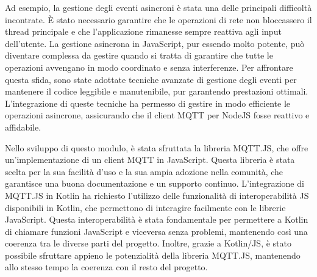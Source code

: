 \documentclass[12pt,a4paper,openright,twoside]{book}
\begin{document}
Ad esempio, la gestione degli eventi asincroni è stata una delle principali difficoltà incontrate. È stato necessario garantire che le operazioni di rete non bloccassero 
il thread principale e che l'applicazione rimanesse sempre reattiva agli input dell'utente. La gestione asincrona in JavaScript, pur essendo molto potente, 
può diventare complessa da gestire quando si tratta di garantire che tutte le operazioni avvengano in modo coordinato e senza interferenze. Per affrontare questa sfida, 
sono state adottate tecniche avanzate di gestione degli eventi per mantenere il codice leggibile e manutenibile, pur garantendo prestazioni ottimali. 
L'integrazione di queste tecniche ha permesso di gestire in modo efficiente le operazioni asincrone, assicurando che il client \ac{MQTT} per NodeJS fosse reattivo e affidabile.

Nello sviluppo di questo modulo, è stata sfruttata la libreria MQTT.JS, che offre un'implementazione di un client \ac{MQTT} in JavaScript. 
Questa libreria è stata scelta per la sua facilità d'uso e la sua ampia adozione nella comunità, che garantisce una buona documentazione e un supporto continuo. 
L'integrazione di MQTT.JS in Kotlin ha richiesto l'utilizzo delle funzionalità di interoperabilità \ac{JS} disponibili in Kotlin, che permettono di interagire 
facilmente con le librerie JavaScript. Questa interoperabilità è stata fondamentale per permettere a Kotlin di chiamare funzioni JavaScript e viceversa senza problemi, 
mantenendo così una coerenza tra le diverse parti del progetto. Inoltre, grazie a Kotlin/JS, è stato possibile sfruttare appieno le potenzialità della libreria MQTT.JS, 
mantenendo allo stesso tempo la coerenza con il resto del progetto.
\end{document}
